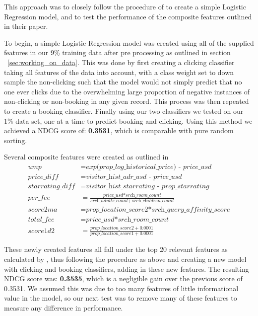 \documentclass{llncs}
\begin{document}
This approach was to closely follow the procedure of \cite{DBLP:journals/corr/LiuXZYPLSW13} to create a simple Logistic Regression model, and to test the performance of the composite features outlined in their paper.

To begin, a simple Logistic Regression model was created using all of the supplied features in our 9\% training data after pre processing as outlined in section ~\ref{sec:working_on_data}. This was done by first creating a clicking classifier taking all features of the data into account, with a class weight set to down sample the non-clicking such that the model would not simply predict that no one ever clicks due to the overwhelming large proportion of negative instances of non-clicking or non-booking in any given record. This process was then repeated to create a booking classifier.
Finally using our two classifiers we tested on our 1\% data set, one at a time to predict booking and clicking. Using this method we achieved a NDCG score of: \textbf{0.3531}, which is comparable with pure random sorting.

Several composite features were created as outlined in \cite{DBLP:journals/corr/LiuXZYPLSW13}
\begin{align*}
    \textit{ump} &= \textit{exp(prop\_ log\_ historical\_ price) - price\_ usd}\\
    \textit{price\_ diff} &= \textit{visitor\_ hist\_ adr\_ usd - price\_ usd}\\
    \textit{starrating\_ diff} &= \textit{visitor\_ hist\_ starrating - prop\_ starrating}\\
    \textit{per\_ fee} &= \frac{\textit{price\_ usd*srch\_ room\_ count}}{\textit{srch\_ adults\_ count+srch\_ children\_ count}}\\
    \textit{score2ma} &= \textit{prop\_ location\_ score2*srch\_ query\_ affinity\_ score}\\
    \textit{total\_ fee} &= \textit{price\_ usd*srch\_ room\_ count}\\
    \textit{score1d2} &= \frac{\textit{prop\_ location\_ score2} + 0.0001}{\textit{prop\_ location\_ score1} + 0.0001}
\end{align*}

These newly created features all fall under the top 20 relevant features as calculated by \cite{DBLP:journals/corr/LiuXZYPLSW13}, thus following the procedure as above and creating a new model with clicking and booking classifiers, adding in these new features. The resulting NDCG score was: \textbf{0.3535}, which is a negligible gain over the previous score of 0.3531. We assumed this was due to too many features of little informational value in the model, so our next test was to remove many of these features to measure any difference in performance.
\end{document}
